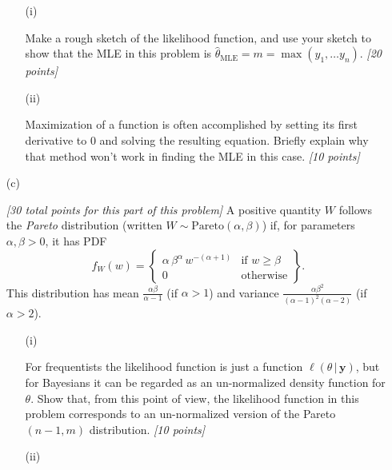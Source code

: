 \documentclass[12pt]{article}
\newcommand{\given}{\, | \,}
\begin{document}
\begin{itemize}
\begin{itemize}
\item[(i)]

Make a rough sketch of the likelihood function, and use your sketch to show that the MLE in this problem is $\hat{ \theta }_{ \text{MLE} } = m = \max \left( y_1, \ldots y_n \right)$. \textit{[20 points]}

\item[(ii)]

Maximization of a function is often accomplished by setting its first derivative to 0 and solving the resulting equation. Briefly explain why that method won't work in finding the MLE in this case. \textit{[10 points]}

\end{itemize}

\item[(c)] 

\textit{[30 total points for this part of this problem]} A positive quantity $W$ follows the \textit{Pareto} distribution (written $W \sim \mbox{Pareto} ( \alpha, \beta )$) if, for parameters $\alpha, \beta > 0$, it has PDF
\begin{equation} \label{uniform-3}
f_W( w ) = \left\{ \begin{array}{cc} \alpha \, \beta^{ \alpha } \, w^{ - ( \alpha + 1 ) } & \mbox{if } w \ge \beta \\ 0 & \mbox{otherwise} \end{array} \right\} .  
\end{equation} 
This distribution has mean $\frac{ \alpha \beta }{ \alpha - 1 }$ (if
$\alpha > 1$) and variance $\frac{ \alpha \beta^2 }{ ( \alpha - 1 )^2 (
\alpha - 2 ) }$ (if $\alpha > 2$).

\begin{itemize}

\item[(i)]

For frequentists the likelihood function is just a function $\ell ( \theta \given \bm{ y } )$, but for Bayesians it can be regarded as an un-normalized density function for $\theta$. Show that, from this point of view, the likelihood function in this problem corresponds to an un-normalized version of the Pareto$( n - 1, m )$ distribution. \textit{[10 points]}

\item[(ii)]


\end{itemize}
\end{itemize}
\end{document}

